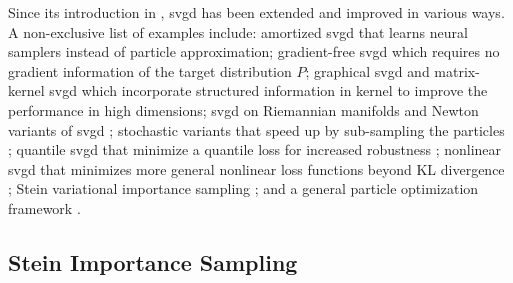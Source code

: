 \documentclass[12pt,paper=letter]{scrreprt}
\begin{document}
Since its introduction in \citet{Liu2016}, \ac{svgd} has been extended and improved in various ways. 
A non-exclusive list of examples include: amortized \ac{svgd} \citep{feng2017learning,wang2016learning,liu2017learning} that learns neural samplers instead of particle approximation; gradient-free \ac{svgd} \citep{han2018stein} which requires no gradient information of the target distribution $P$; 
graphical \ac{svgd} \citep{wang2018stein, zhuo2018message} and matrix-kernel \ac{svgd} \citep{wang2019stein} which incorporate structured information in kernel to improve the performance in high dimensions; 
\ac{svgd} on Riemannian manifolds \citep{liu2017riemannian} and Newton variants of \ac{svgd} \citep{detommaso2018stein, chen2019projected};   
stochastic variants that speed up by sub-sampling the particles \citep{li2020stochastic, gorham2020stochastic}; 
quantile \ac{svgd} that minimize a quantile loss for increased robustness \citep{gong2019quantile}; 
nonlinear \ac{svgd} that minimizes more general nonlinear loss functions beyond KL divergence \citep{wang2019nonlinear}; 
Stein variational importance sampling \citep{han2017stein}; and a 
general particle optimization framework \citep{chen2018unified}. 





































\subsection{Stein Importance Sampling}
\label{subsec: stein importance sampling}
\end{document}
